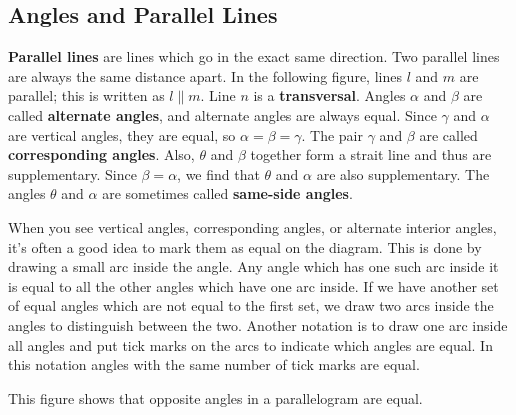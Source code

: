 \documentclass{article}
\begin{document}
\begin{multicols}{2}
	\section*{Angles and Parallel Lines}
	\textbf{Parallel lines} are lines which go in the exact same direction.
	Two parallel lines are always the same distance apart.
	In the following figure, lines $l$ and $m$ are parallel; this is written as $l \parallel m$.
	Line $n$ is a \textbf{transversal}.
	Angles $\alpha$ and $\beta$ are called \textbf{alternate angles}, and alternate angles are always equal.
	Since $\gamma$ and $\alpha$ are vertical angles, they are equal, so $\alpha = \beta = \gamma$.
	The pair $\gamma$ and $\beta$ are called \textbf{corresponding angles}.
	Also, $\theta$ and $\beta$ together form a strait line and thus are supplementary.
	Since $\beta = \alpha$, we find that $\theta$ and $\alpha$ are also supplementary.
	The angles $\theta$ and $\alpha$ are sometimes called \textbf{same-side angles}.

	When you see vertical angles, corresponding angles, or alternate interior angles, it's often a good idea to mark them as equal on the diagram.
	This is done by drawing a small arc inside the angle.
	Any angle which has one such arc inside it is equal to all the other angles which have one arc inside.
	If we have another set of equal angles which are not equal to the first set, we draw two arcs inside the angles to distinguish between the two.
	Another notation is to draw one arc inside all angles and put tick marks on the arcs to indicate which angles are equal.
	In this notation angles with the same number of tick marks are equal.
	\begin{center}
	\end{center}

	This figure shows that opposite angles in a parallelogram are equal.


\end{multicols}
\end{document}
